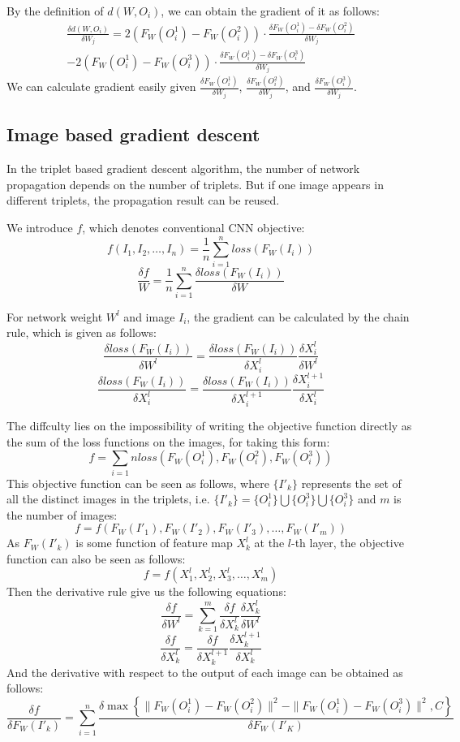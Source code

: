 By the definition of $d(W, O_i)$, we can obtain the gradient of it as follows:
\[
\begin{split}
	\frac{ \delta d(W, O_i) }{ \delta W_j } =
		2 (F_W(O_i^1) - F_W(O_i^2)) \cdot \frac{ \delta F_W(O_i^1) - \delta F_W(O_i^2) }{ \delta W_j }
		\\ -
		2 (F_W(O_i^1) - F_W(O_i^3)) \cdot \frac{ \delta F_W(O_i^1) - \delta F_W(O_i^3) }{ \delta W_j }
\end{split}
\]
We can calculate gradient easily given $\frac{\delta F_W(O_i^1)}{\delta W_j}$, $\frac{\delta F_W(O_i^2)}{\delta W_j}$,
and $\frac{\delta F_W(O_i^3)}{\delta W_j}$.

\subsection{Image based gradient descent}
In the triplet based gradient descent algorithm, the number of network propagation depends on the number
of triplets. But if one image appears in different triplets, the propagation result can be reused.

We introduce $f$, which denotes conventional CNN objective:
\[
	f(I_1, I_2, \dots, I_n) = \frac{1}{n} \sum_{i=1}^{n} loss(F_W(I_i))
\]
\[
	\frac{\delta f}{W} = \frac{1}{n} \sum_{i=1}^{n} \frac{\delta loss(F_W(I_i))}{\delta W}
\]

For network weight $W^l$ and image $I_i$, the gradient can be calculated by the chain rule, which is given
as follows:
\[
	\frac{\delta loss(F_W(I_i))}{\delta W^l} = \frac{\delta loss(F_W(I_i))}{\delta X_i^l}
		\frac{\delta X_i^l}{\delta W^l}
\]
\[
	\frac{\delta loss(F_W(I_i))}{\delta X_i^l} = \frac{\delta loss(F_W(I_i))}{ \delta X_i^{l+1} }
		\frac{ \delta X_i^{l+1} }{ \delta X_i^l }
\]

The diffculty lies on the impossibility of writing the objective function directly as the sum of the loss
functions on the images, for taking this form:
\[
	f = \sum_{i=1}{n} loss(F_W(O_i^1), F_W(O_i^2), F_W(O_i^3))
\]
This objective function can be seen as follows, where $\{I'_k\}$ represents the set of all the distinct
images in the triplets, i.e. $\{I'_k\} = \{O_i^1\} \bigcup \{O_i^3\} \bigcup \{O_i^3\}$ and $m$ is the
number of images:
\[
	f = f(F_W(I'_1), F_W(I'_2), F_W(I'_3), \dots, F_W(I'_m))
\]
As $F_W(I'_k)$ is some function of feature map $X_k^l$ at the $l$-th layer, the objective function can also
be seen as follows:
\[
	f = f(X_1^l, X_2^l, X_3^l, \dots, X_m^l)
\]
Then the derivative rule give us the following equations:
\[
	\frac{\delta f}{\delta W^l} = \sum_{k=1}^{m} \frac{\delta f}{\delta X_k^l} \frac{\delta X_k^l}{\delta W^l}
\]
\[
	\frac{\delta f}{\delta X_k^l} = \frac{\delta f}{\delta X_k^{l+1}} \frac{\delta X_k^{l+1}}{\delta X_k^l}
\]
And the derivative with respect to the output of each image can be obtained as follows:
$$
	\frac{\delta f}{\delta F_W(I'_k)} = \sum_{i=1}^{n} \frac
		{\delta \max \left\{ \parallel F_W(O_i^1) - F_W(O_i^2) \parallel^2
			- \parallel F_W(O_i^1) - F_W(O_i^3) \parallel^2, C \right\} }
		{\delta F_W(I'_K)}
$$

